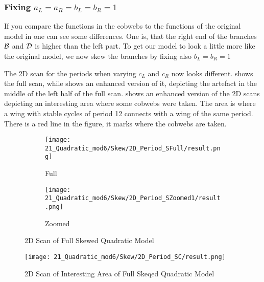 \subsubsection{Fixing $a_L = a_R = b_L = b_R = 1$}

If you compare the functions in the cobwebs  to the functions of the original model in  one can see some differences.
One is, that the right end of the branches $\mathcal{B}$ and $\mathcal{D}$ is higher than the left part.
To get our model to look a little more like the original model, we now skew the branches by fixing also $b_L = b_R = 1$

The 2D scan for the periods when varying $c_L$ and $c_R$ now looks different.
 shows the full scan, while  shows an enhanced version of it, depicting the artefact in the middle of the left half of the full scan.
 shows an enhanced version of the 2D scans depicting an interesting area where some cobwebs were taken.
The area is where a wing with stable cycles of period 12 connects with a wing of the same period.
There is a red line in the figure, it marks where the cobwebs are taken.

\begin{figure}
    \centering
    \begin{subfigure}{0.4\textwidth}
        \centering
        \texttt{[image: 21\_Quadratic\_mod6/Skew/2D\_Period\_SFull/result.png]}
        \caption{Full}
        \label{fig:quadratic.full.skew.2d.full}
    \end{subfigure}
    \begin{subfigure}{0.4\textwidth}
        \centering
        \texttt{[image: 21\_Quadratic\_mod6/Skew/2D\_Period\_SZoomed1/result.png]}
        \caption{Zoomed}
        \label{fig:quadratic.full.skew.2d.z1}
    \end{subfigure}
    \caption{2D Scan of Full Skewed Quadratic Model}
\end{figure}

\begin{figure}
    \centering
    \texttt{[image: 21\_Quadratic\_mod6/Skew/2D\_Period\_SC/result.png]}
    \caption{2D Scan of Interesting Area of Full Skeqed Quadratic Model}
    \label{fig:quadratic.full.skew.2d.c}
\end{figure}

